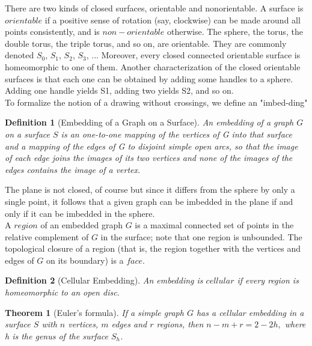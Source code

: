 \documentclass[10pt]{article}
\newtheorem{definition}{Definition}
\newtheorem{theorem}{Theorem}
\begin{document}
There are two kinds of closed surfaces, orientable and nonorientable. A surface is $orientable$ if a positive sense of rotation (say, clockwise) can be made around all points consistently, and is $non-orientable$ otherwise. The sphere, the torus, the double torus, the triple torus, and so on, are orientable. They are commonly denoted $S_0$, $S_1$, $S_2$, $S_3$, ... Moreover, every closed connected orientable surface is homeomorphic to one of them. Another characterization of the closed orientable surfaces is that each one can be obtained by adding some handles to a sphere. Adding one handle yields S1, adding two yields S2, and so on.\\

To formalize the notion of a drawing without crossings, we define an "imbed-ding"\\
  
\begin{definition}[Embedding of a Graph on a Surface]
An embedding of a graph $G$ on a surface $S$ is an one-to-one mapping of the vertices of G into that surface and a mapping of the edges of G to disjoint simple open arcs, so that the image of each edge joins the images of its two vertices and none of the images of the edges contains the image of a vertex.
\end{definition}

The plane is not closed, of course but since it differs from the sphere by only a single point, it follows that a given graph can be imbedded in the plane if and only if it can be imbedded in the sphere.\\

A $region$ of an embedded graph $G$ is a maximal connected set of points in the relative complement of $G$ in the surface; note that one region is unbounded. The topological closure of a region (that is, the region together with the vertices and edges of $G$ on its boundary) is a $face$.

\begin{definition}[Cellular Embedding]
 An embedding is $cellular$ if every region is homeomorphic to an open disc.
\end{definition}

\begin{theorem}[Euler’s formula]
    If a simple graph $G$ has a cellular embedding in a surface $S$ with $n$ vertices, $m$ edges and $r$ regions, then
    $n-m+r=2-2h,$ where h is the genus of the surface $S_h$.
\end{theorem}
\end{document}
